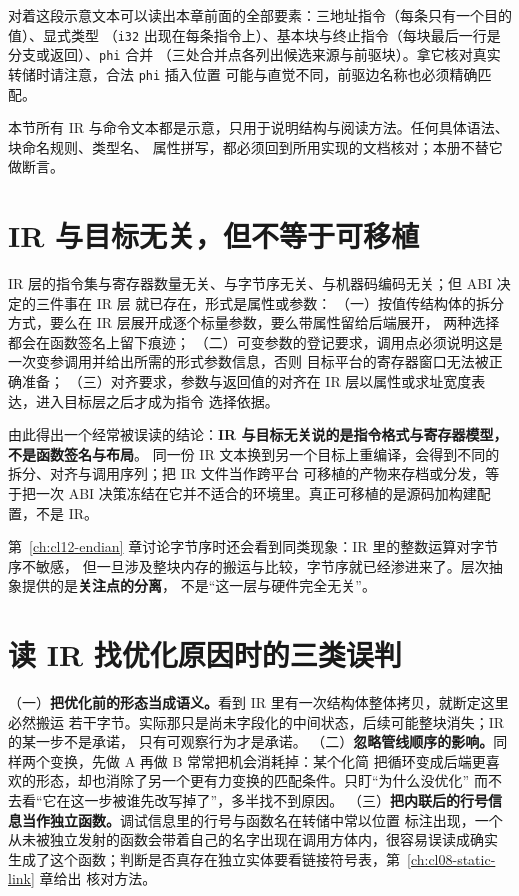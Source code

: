 \documentclass[12pt,a4paper,fontset=fandol]{ctexbook}
\newcommand{\Tp}[1]{\texttt{#1}}
\begin{document}
对着这段示意文本可以读出本章前面的全部要素：三地址指令（每条只有一个目的值）、显式类型
（\Tp{i32} 出现在每条指令上）、基本块与终止指令（每块最后一行是分支或返回）、\Tp{phi} 合并
（三处合并点各列出候选来源与前驱块）。拿它核对真实转储时请注意，合法 \Tp{phi} 插入位置
可能与直觉不同，前驱边名称也必须精确匹配。

\begin{note}[title={示意性说明}]
本节所有 IR 与命令文本都是示意，只用于说明结构与阅读方法。任何具体语法、块命名规则、类型名、
属性拼写，都必须回到所用实现的文档核对；本册不替它做断言。
\end{note}

\section{IR 与目标无关，但不等于可移植}\label{sec:cl04-abi-ir}

\begin{abibox}[title={目标无关的 IR 里为什么已经有 ABI 的痕迹}]
IR 层的指令集与寄存器数量无关、与字节序无关、与机器码编码无关；但 ABI 决定的三件事在 IR 层
就已存在，形式是属性或参数：
（一）按值传结构体的拆分方式，要么在 IR 层展开成逐个标量参数，要么带属性留给后端展开，
两种选择都会在函数签名上留下痕迹；
（二）可变参数的登记要求，调用点必须说明这是一次变参调用并给出所需的形式参数信息，否则
目标平台的寄存器窗口无法被正确准备；
（三）对齐要求，参数与返回值的对齐在 IR 层以属性或求址宽度表达，进入目标层之后才成为指令
选择依据。
\end{abibox}

由此得出一个经常被误读的结论：\textbf{IR 与目标无关说的是指令格式与寄存器模型，不是函数签名与布局}。
同一份 IR 文本换到另一个目标上重编译，会得到不同的拆分、对齐与调用序列；把 IR 文件当作跨平台
可移植的产物来存档或分发，等于把一次 ABI 决策冻结在它并不适合的环境里。真正可移植的是源码加构建配置，不是 IR。

第~\ref{ch:cl12-endian} 章讨论字节序时还会看到同类现象：IR 里的整数运算对字节序不敏感，
但一旦涉及整块内存的搬运与比较，字节序就已经渗进来了。层次抽象提供的是\textbf{关注点的分离}，
不是“这一层与硬件完全无关”。

\section{读 IR 找优化原因时的三类误判}\label{sec:cl04-misread}

\begin{warning}[title={三类常见误判}]
（一）\textbf{把优化前的形态当成语义。}看到 IR 里有一次结构体整体拷贝，就断定这里必然搬运
若干字节。实际那只是尚未字段化的中间状态，后续可能整块消失；IR 的某一步不是承诺，
只有可观察行为才是承诺。
（二）\textbf{忽略管线顺序的影响。}同样两个变换，先做 A 再做 B 常常把机会消耗掉：某个化简
把循环变成后端更喜欢的形态，却也消除了另一个更有力变换的匹配条件。只盯“为什么没优化”
而不去看“它在这一步被谁先改写掉了”，多半找不到原因。
（三）\textbf{把内联后的行号信息当作独立函数。}调试信息里的行号与函数名在转储中常以位置
标注出现，一个从未被独立发射的函数会带着自己的名字出现在调用方体内，很容易误读成确实
生成了这个函数；判断是否真存在独立实体要看链接符号表，第~\ref{ch:cl08-static-link} 章给出
核对方法。
\end{warning}
\end{document}
